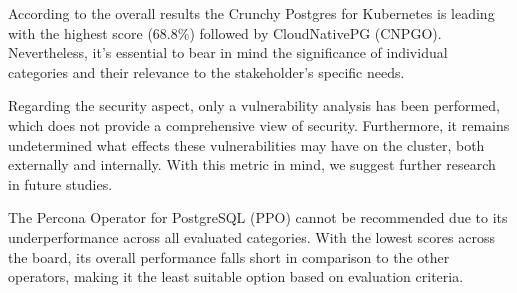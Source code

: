 According to the overall results the Crunchy Postgres for Kubernetes is leading with the highest score (68.8\%) followed by CloudNativePG (CNPGO). Nevertheless, it's essential to bear in mind the significance of individual categories and their relevance to the stakeholder's specific needs.

Regarding the security aspect, only a vulnerability analysis has been performed, which does not provide a comprehensive view of security. Furthermore, it remains undetermined what effects these vulnerabilities may have on the cluster, both externally and internally. With this metric in mind, we suggest further research in future studies.

The Percona Operator for PostgreSQL (PPO) cannot be recommended due to its underperformance across all evaluated categories. With the lowest scores across the board, its overall performance falls short in comparison to the other operators, making it the least suitable option based on evaluation criteria.







